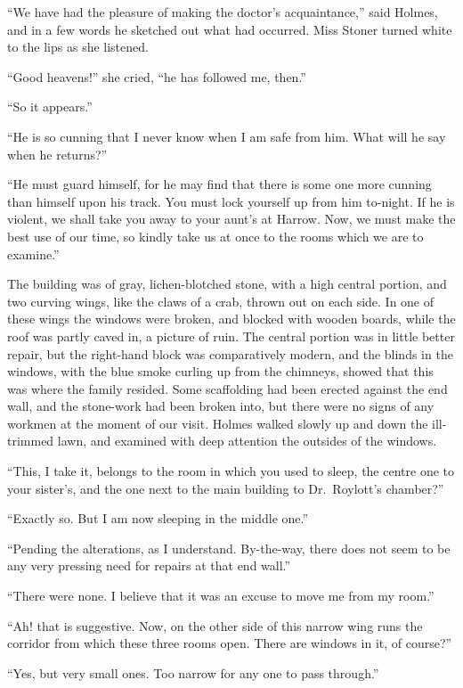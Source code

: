 “We have had the pleasure of making the doctor’s acquaintance,”
said Holmes, and in a few words he sketched out what
had occurred. Miss Stoner turned white to the lips as she
listened.

“Good heavens!” she cried, “he has followed me, then.”

“So it appears.”

“He is so cunning that I never know when I am safe from
him. What will he say when he returns?”

“He must guard himself, for he may find that there is some
one more cunning than himself upon his track. You must
lock yourself up from him to-night. If he is violent, we shall
take you away to your aunt’s at Harrow. Now, we must make
the best use of our time, so kindly take us at once to the rooms
which we are to examine.”

The building was of gray, lichen-blotched stone, with a high
central portion, and two curving wings, like the claws of a
crab, thrown out on each side. In one of these wings the
windows were broken, and blocked with wooden boards, while
the roof was partly caved in, a picture of ruin. The central
portion was in little better repair, but the right-hand block
was comparatively modern, and the blinds in the windows,
with the blue smoke curling up from the chimneys, showed
that this was where the family resided. Some scaffolding had
been erected against the end wall, and the stone-work had
been broken into, but there were no signs of any workmen at
the moment of our visit. Holmes walked slowly up and down
the ill-trimmed lawn, and examined with deep attention the
outsides of the windows.

“This, I take it, belongs to the room in which you used to
sleep, the centre one to your sister’s, and the one next to the
main building to Dr.\ Roylott’s chamber?”

“Exactly so. But I am now sleeping in the middle one.”

“Pending the alterations, as I understand. By-the-way,
there does not seem to be any very pressing need for repairs
at that end wall.”

“There were none. I believe that it was an excuse to move
me from my room.”

“Ah! that is suggestive. Now, on the other side of this
narrow wing runs the corridor from which these three rooms
open. There are windows in it, of course?”

“Yes, but very small ones. Too narrow for any one to pass
through.”

